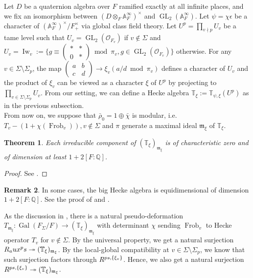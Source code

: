 \documentclass[12pt]{amsart}
\theoremstyle{plain}
\newtheorem{thm}{Theorem}[subsection]
\theoremstyle{definition}
\newtheorem{rem}[thm]{Remark}
\theoremstyle{remark}
\begin{document}
Let $D$ be a quaternion algebra over $F$ ramified exactly at all infinite places, and we fix an isomorphism between $( D \otimes_F \mathbb{A}_F^\infty)^\times$ and $\operatorname{GL}_2(\mathbb{A}_F^\infty)$. Let $\psi=\chi \epsilon$ be a character of $ (\mathbb{A}_F^\infty)^\times/ F_+^\times$ via global class field theory. Let $U^p=\prod_{v \nmid p} U_v$ be a tame level such that $U_v= \operatorname{GL}_2(\mathcal{O}_{F_v})$ if $v \notin \Sigma$ and $U_v = \operatorname{Iw}_v := \{g \equiv \begin{pmatrix}
	* & *\\
	0 & *
\end{pmatrix}
~\operatorname{mod}~\pi_v, g \in \operatorname{GL}_2(\mathcal{O}_{F_v})\}$ otherwise. For any $v \in \Sigma \setminus \Sigma_p$, the map $\begin{pmatrix}
	a & b\\
	c & d
\end{pmatrix} \to \xi_v (a/d~\operatorname{mod}~\pi_v)$ defines a character of $U_v$ and the product of $\xi_v$ can be viewed as a character $\xi$ of $U^p$ by projecting to $\prod_{v \in  \Sigma \setminus \Sigma_p} U_v$. From our setting, we can define a Hecke algebra $\mathbb{T}_{\xi} := \mathbb{T}_{\psi, \xi}(U^p)$ as in the previous subsection.\\

From now on, we suppose that $\bar{\rho}_0= 1 \oplus \bar{\chi}$ is modular, i.e. $T_v-(1+\chi(\operatorname{Frob}_v)), v \notin \Sigma$ and $\pi$ generate a maximal ideal $\mathfrak{m}_{\xi}$ of $ \mathbb{T}_{\xi}$. 

\begin{thm} \label{dimofT}
	Each irreducible component of $(\mathbb{T}_{\xi})_{\mathfrak{m}_{\xi}} $ is of characteristic zero and of dimension at least $1+2[F:\mathbb{Q}]$.
\end{thm}

\begin{proof}
	See \cite[Theorem 3.6.1]{pan2022fontaine}.
\end{proof}
	
	\begin{rem}
		In some cases, the big Hecke algebra is equidimensional of dimension $1+2[F:\mathbb{Q}]$. See the proof of \cite[Theorem 3.6.1]{pan2022fontaine} and \cite[Remark 3.6.10]{pan2022fontaine}.
	\end{rem}
	
As the discussion in \cite[3.3.4]{pan2022fontaine}, there is a natural pseudo-deformation $T_{\mathfrak{m}_{\xi}} : \operatorname{Gal}(F_{\Sigma}/F) \to (\mathbb{T}_{\xi})_{\mathfrak{m}_{\xi}}$ with determinant $\chi$ sending $\operatorname{Frob}_v$ to Hecke operator $T_v$ for $v \notin \Sigma$. By the universal property, we get a natural surjection $ R_\textnormal{aux}^\textnormal{ps} \twoheadrightarrow (\mathbb{T}_{\xi})_{\mathfrak{m}_{\xi}}$. By the local-global compatibility at $v \in \Sigma \setminus \Sigma_p$, we know that such surjection factors through $R^{\textnormal{ps}, \{\xi_v\}} $. Hence, we also get a natural surjection $R^{\textnormal{ps}, \{\xi_v\}} \twoheadrightarrow (\mathbb{T}_{\xi})_{\mathfrak{m}_{\xi}} $.
\end{document}

